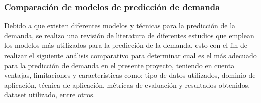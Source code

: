 \subsubsection{Comparación de modelos de predicción de demanda}

Debido a que existen diferentes modelos y técnicas para la predicción de la demanda, se realizo una revisión de literatura de diferentes estudios que emplean los modelos más utilizados para la predicción de la demanda, esto con el fin de realizar el siguiente análisis comparativo para determinar cual es el más adecuado para la predicción de demanda en el presente proyecto, teniendo en cuenta ventajas, limitaciones y características como: tipo de datos utilizados, dominio de aplicación, técnica de aplicación, métricas de evaluación y resultados obtenidos, dataset utilizado, entre otros.

